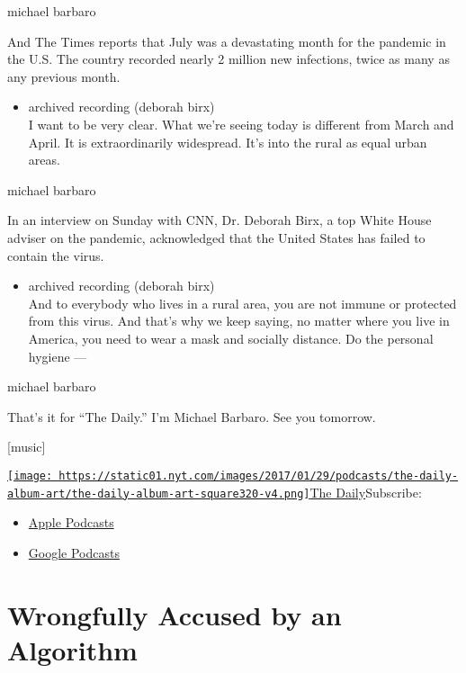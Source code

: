 michael barbaro

And The Times reports that July was a devastating month for the pandemic
in the U.S. The country recorded nearly 2 million new infections, twice
as many as any previous month.

\begin{itemize}
\tightlist
\item
  archived recording (deborah birx)\\
  I want to be very clear. What we're seeing today is different from
  March and April. It is extraordinarily widespread. It's into the rural
  as equal urban areas.
\end{itemize}

michael barbaro

In an interview on Sunday with CNN, Dr. Deborah Birx, a top White House
adviser on the pandemic, acknowledged that the United States has failed
to contain the virus.

\begin{itemize}
\tightlist
\item
  archived recording (deborah birx)\\
  And to everybody who lives in a rural area, you are not immune or
  protected from this virus. And that's why we keep saying, no matter
  where you live in America, you need to wear a mask and socially
  distance. Do the personal hygiene ---
\end{itemize}

michael barbaro

That's it for ``The Daily.'' I'm Michael Barbaro. See you tomorrow.

{[}music{]}

\href{https://www.nytimes.com/column/the-daily}{\texttt{[image: https://static01.nyt.com/images/2017/01/29/podcasts/the-daily-album-art/the-daily-album-art-square320-v4.png]}The
Daily}Subscribe:

\begin{itemize}
\tightlist
\item
  \href{https://itunes.apple.com/us/podcast/id1200361736}{Apple
  Podcasts}
\item
  \href{https://www.google.com/podcasts?feed=aHR0cHM6Ly9yc3MuYXJ0MTkuY29tL3RoZS1kYWlseQ\%3D\%3D}{Google
  Podcasts}
\end{itemize}

\hypertarget{wrongfully-accused-by-an-algorithm-1}{%
\section{Wrongfully Accused by an
Algorithm}\label{wrongfully-accused-by-an-algorithm-1}}


